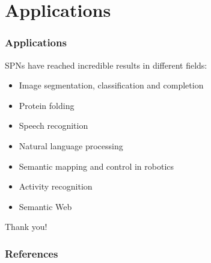 \documentclass[pdf]{beamer}
\begin{document}
\section{Applications}

\begin{frame}
  \frametitle{Applications}

  SPNs have reached incredible results in different fields:
  \vspace{0.5cm}

  \begin{itemize}
    \item Image segmentation, classification and completion
    \item Protein folding
    \item Speech recognition
    \item Natural language processing
    \item Semantic mapping and control in robotics
    \item Activity recognition
    \item Semantic Web
  \end{itemize}
\end{frame}

\begin{frame}
  \begin{center}
    \huge Thank you!
  \end{center}
\end{frame}

\begin{frame}[t,allowframebreaks]
  \frametitle{References}
  \printbibliography[heading=none]
\end{frame}
\end{document}
